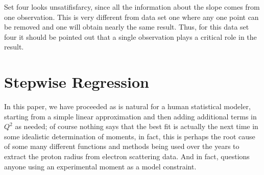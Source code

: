 \documentclass[10pt,aps,prc,twocolumn]{revtex4-1}
\begin{document}
\begin{appendix}
Set four looks unsatifisfarcy, since all the information about the slope comes
from one observation.   This is very different from data set one where any one point
can be removed and one will obtain nearly the same result.   Thus, for this data set
four it should be pointed out that a single observation plays a critical role
in the result.

%
%

\section{Stepwise Regression}
%
In this paper, we have proceeded as is natural for a human statistical modeler, starting from a simple
linear approximation and then adding additional terms in $Q^2$ as needed; of course nothing
says that the best fit is actually the next time in some idealistic determination of moments,
in fact, this is perhaps the root cause of some many different functions and methods being used
over the years to extract the proton radius from electron scattering data.   And in fact, questions
anyone using an experimental moment as a model constraint.


\end{appendix}
\end{document}
